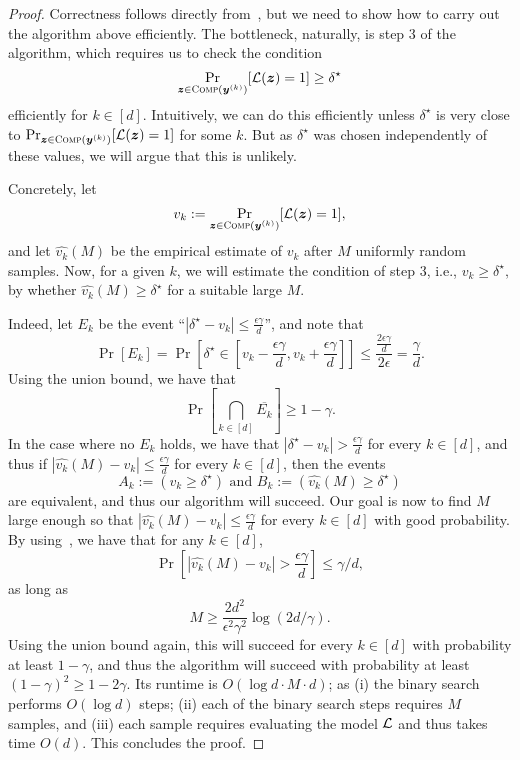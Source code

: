 \begin{proof}
Correctness follows directly from~, but we need to show how to carry out the algorithm above efficiently.
The bottleneck, naturally, is step 3 of the algorithm, which requires us to check the condition
\[
	\Pr_{{\bm{z}} \in \textsc{Comp}({\bm{y}}^{(k)})}[\mathcal{L}({\bm{z}}) = 1] \geq \delta^\star  
\]
efficiently for $k \in [d]$. Intuitively, we can do this efficiently unless $\delta^\star$ is very close to
\(
	\Pr_{{\bm{z}} \in \textsc{Comp}({\bm{y}}^{(k)})}[\mathcal{L}({\bm{z}}) = 1]
\) for some $k$. But as $\delta^\star$ was chosen independently of these values, we will argue that this is unlikely. 

Concretely, let
\[
	v_k := \Pr_{{\bm{z}} \in \textsc{Comp}({\bm{y}}^{(k)})}[\mathcal{L}({\bm{z}}) = 1],
\]
and let 
\(
	\hat{v_k}(M)  
\) be the empirical estimate of $v_k$ after $M$ uniformly random samples. 
Now, for a given $k$, we will estimate the condition of step 3, i.e.,
\(
	v_k \geq \delta^\star,
\) by whether \(
	\hat{v_k}(M) \geq \delta^\star 
\) for a suitable large $M$.

Indeed, let $E_k$ be the event ``$|\delta^\star - v_k| \leq \frac{\epsilon \gamma}{d}$'', and note that 
\[
	\Pr[E_k] = \Pr\left[\delta^\star \in \left[v_k - \frac{\epsilon \gamma}{d}, v_k + \frac{\epsilon \gamma}{d}\right]\right] \leq \frac{\frac{2\epsilon \gamma}{d}}{2\epsilon} = \frac{\gamma}{d}.
\]
Using the union bound, we have that 
\[
	\Pr\left[\bigcap_{k \in [d]} \overline{E_k}\right] \geq 1 - \gamma.
\]
In the case where no $E_k$ holds, we have that $|\delta^\star - v_k| > \frac{\epsilon \gamma}{d}$ for every $k \in [d]$, and thus 
if $|\hat{v_k}(M)  - v_k| \leq \frac{\epsilon \gamma}{d}$ for every $k \in [d]$, then the events 
\[
	A_k := \left(v_k \geq \delta^\star \right) \text{ and }  B_k := \left(\hat{v_k}(M) \geq \delta^\star\right)
\]
are equivalent, and thus our algorithm will succeed. Our goal is now to find $M$ large enough so that 
$|\hat{v_k}(M)  - v_k| \leq \frac{\epsilon \gamma}{d}$ for every $k \in [d]$ with good probability. By using~, we have that for any $k \in [d]$,
\[
	\Pr\left[|\hat{v_k}(M) - v_k| > \frac{\epsilon \gamma}{d}\right] \leq  \gamma/d,
\]  as long as 
\[ 
	M \geq \frac{2d^2}{\epsilon^2 \gamma^2}  \log(2d/\gamma).
\]
Using the union bound again, this will succeed for every $k \in [d]$ with probability at least $1 - \gamma$, and thus the algorithm will succeed with probability at least $(1-\gamma)^2  \geq 1 - 2\gamma$. Its runtime is 
$O(\log d \cdot M \cdot d  )$; as (i) the binary search performs $O(\log d)$ steps; (ii) each of the binary search steps requires $M$ samples, and (iii) each sample requires evaluating the model $\mathcal{L}$ and thus takes time $O(d)$. This concludes the proof.



\end{proof}
